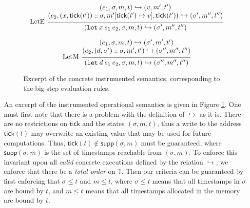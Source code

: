 \documentclass[acmsmall,screen,review]{acmart}\settopmatter{printfolios=true,printccs=false,printacmref=false}
\theoremstyle{acmdefinition}
\newcommand*{\cons}{::}
\newcommand*{\modid}{d}
\newcommand*{\Time}{\mathbb{T}}
\newcommand*{\ctx}{\sigma}
\newcommand*{\mem}{m}
\newcommand*{\semarrow}{\hookrightarrow}
\newcommand*{\tick}{\mathsf{tick}}
\begin{document}
\begin{figure}[t!]
  \[
    \begin{prooftree}
      \hypo{
        \begin{matrix}
          (e_{1}, \ctx, \mem, t)
          \semarrow
          (v, \mem', t') \\
          (e_{2}, (x, \tick(t'))\cons \ctx, \mem'[\tick(t')\mapsto v], \tick(t'))
          \semarrow
          (\ctx', \mem'', t'')
        \end{matrix}
      }
      \infer[left label=LetE]1{
      (\mathtt{let}\:x\:e_1\:e_2, \ctx, \mem, t)
      \semarrow
      (\ctx', \mem'', t'')
      }
    \end{prooftree}
  \]

  \[
    \begin{prooftree}
      \hypo{
        \begin{matrix}
          (e_{1}, \ctx, \mem, t)
          \semarrow
          (\ctx', \mem', t') \\
          (e_{2}, (\modid, \ctx')\cons \ctx, \mem', t')
          \semarrow
          (\ctx'', \mem'', t'')
        \end{matrix}
      }
      \infer[left label=LetM]1{
      (\mathtt{let}\:\modid\:e_{1}\:e_{2}, \ctx, \mem, t)
      \semarrow
      (\ctx'', \mem'', t'')
      }
    \end{prooftree}
  \]
  \caption{Excerpt of the concrete instrumented semantics, corresponding to the big-step evaluation rules.}
  \label{fig:concreach}
\end{figure}

An excerpt of the instrumented operational semantics is given in Figure \ref{fig:concreach}.
One must first note that there is a problem with the definition of $\semarrow$ as it is.
There are no restrictions on $\tick$ and the states $(\ctx,\mem,t)$, thus a write to the address $\tick(t)$ may overwrite an existing value that may be used for future computations.
Thus, $\tick(t)\not\in\mathsf{supp}(\ctx,\mem)$ must be guaranteed, where $\mathsf{supp}(\ctx,\mem)$ is the set of timestamps reachable from $(\ctx,\mem)$.
To enforce this invariant upon all \emph{valid} concrete executions defined by the relation $\semarrow$, we enforce that there be a \emph{total order} on $\Time$.
Then our criteria can be guaranteed by first enforcing that $\ctx\le t$ and $\mem\le t$, where $\ctx\le t$ means that all timestamps in $\ctx$ are bound by $t$, and $\mem\le t$ means that all timestamps allocated in the memory are bound by $t$.
\end{document}
